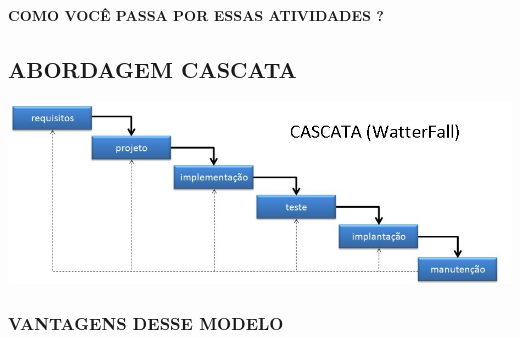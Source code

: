 \documentclass[
]{book}
\begin{document}
\textbf{COMO VOCÊ PASSA POR ESSAS ATIVIDADES ?}

\subsection{ABORDAGEM CASCATA}\label{abordagem-cascata}

\includegraphics{images/modelos_processos_software/Cascata.jpg}

\subsubsection{VANTAGENS DESSE MODELO}\label{vantagens-desse-modelo}
\end{document}
